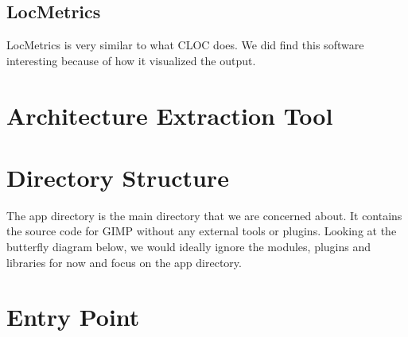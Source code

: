 \subsection{LocMetrics}
LocMetrics\cite{locmetrics} is very similar to what CLOC does. We did find this software interesting because of how it visualized the output.

\section{Architecture Extraction Tool}
\section{Directory Structure}
The app directory is the main directory that we are concerned about. It contains the source code for GIMP without any external tools or plugins. Looking at the butterfly diagram below, we would ideally ignore the modules, plugins and libraries for now and focus on the app directory.
\section{Entry Point}
